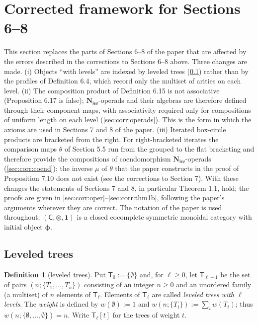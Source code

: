 \documentclass[12pt]{article}
\theoremstyle{plain}
\theoremstyle{definition}
\newtheorem{cdefinition}[ctheorem]{Definition}
\theoremstyle{remark}
\newcommand{\Nl}{\mathbf{N}_{\mathsf{lev}}}
\newcommand{\ptC}{\boldsymbol{\phi}}
\newcommand{\Tr}{\mathsf{T}}
\newcommand{\wt}{w}
\begin{document}
\section*{Corrected framework for Sections 6--8}
\label{sec:corr}

This section replaces the parts of Sections 6--8 of the paper that are affected by the errors described in the corrections to Sections 6--8 above. Three changes are made. (i) Objects ``with levels'' are indexed by leveled trees (\ref{sec:corr:trees}) rather than by the profiles of Definition 6.4, which record only the multiset of arities on each level. (ii) The composition product of Definition 6.15 is not associative (Proposition 6.17 is false); $\Nl$-operads and their algebras are therefore defined through their component maps, with associativity required only for compositions of uniform length on each level (\ref{sec:corr:operads}). This is the form in which the axioms are used in Sections 7 and 8 of the paper. (iii) Iterated box-circle products are bracketed from the right. For right-bracketed iterates the comparison maps $\theta$ of Section 5.5 run from the grouped to the flat bracketing and therefore provide the compositions of coendomorphism $\Nl$-operads (\ref{sec:corr:coend}); the inverse $\mu$ of $\theta$ that the paper constructs in the proof of Proposition 7.10 does not exist (see the corrections to Section 7). With these changes the statements of Sections 7 and 8, in particular Theorem 1.1, hold; the proofs are given in \ref{sec:corr:oper}--\ref{sec:corr:thm1b}, following the paper's arguments wherever they are correct. The notation of the paper is used throughout; $(\mathsf C,\otimes,\mathbf 1)$ is a closed cocomplete symmetric monoidal category with initial object $\ptC$.

\subsection{Leveled trees}
\label{sec:corr:trees}

\begin{cdefinition}[leveled trees]\label{cdef:trees}
Put $\Tr_0:=\{\emptyset\}$ and, for $\ell\geq0$, let $\Tr_{\ell+1}$ be the set of pairs $(n;\{T_1,\dots,T_n\})$ consisting of an integer $n\geq0$ and an unordered family (a multiset) of $n$ elements of $\Tr_\ell$. Elements of $\Tr_\ell$ are called \emph{leveled trees with $\ell$ levels}. The \emph{weight} is defined by $\wt(\emptyset):=1$ and $\wt(n;\{T_i\}):=\sum_i\wt(T_i)$; thus $\wt(n;\{\emptyset,\dots,\emptyset\})=n$. Write $\Tr_\ell[t]$ for the trees of weight $t$.
\end{cdefinition}
\end{document}

